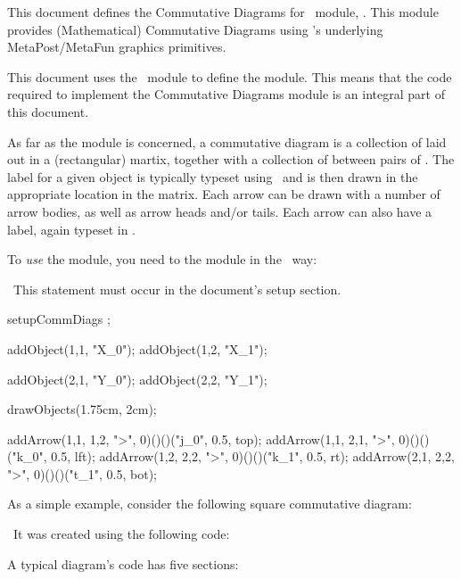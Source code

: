 
\startchapter[title=Overview]

This document defines the Commutative Diagrams for \ConTeXt\ module, 
. This module provides (Mathematical) Commutative 
Diagrams using \ConTeXt's underlying MetaPost/MetaFun graphics primitives. 

This document uses the  \ConTeXt\ module to 
define the  module. This means that the code required to 
implement the Commutative Diagrams module is an integral part of this document. 

As far as the  module is concerned, a commutative diagram 
is a collection of  laid out in a (rectangular) martix, 
together with a collection of  between pairs of 
. The label for a given object is typically typeset using 
\ConTeXt\ and is then drawn in the appropriate location in the matrix. 
Each arrow can be drawn with a number of arrow bodies, as well as arrow 
heads and/or tails. Each arrow can also have a label, again typeset in 
\ConTeXt. 

To \emph{use} the  module, you need to  the 
 module in the  \ConTeXt\ way: 

\starttyping
\usemodule[t-commdiag]
\stoptyping

\noindent\ This \type{\usemodule} statement must occur in the document's 
setup section.

\startbuffer
\startformula {}  
  setupCommDiags ; 
  
  addObject(1,1, "X_0");
  addObject(1,2, "X_1");
  
  addObject(2,1, "Y_0");
  addObject(2,2, "Y_1");

  drawObjects(1.75cm, 2cm);

  addArrow(1,1, 1,2, ">", 0)()()("j_0",     0.5, top);
  addArrow(1,1, 2,1, ">", 0)()()("k_0",     0.5, lft);
  addArrow(1,2, 2,2, ">", 0)()()("k_1",     0.5, rt);
  addArrow(2,1, 2,2, ">", 0)()()("t_1",     0.5, bot);
\stopMPcode \stopformula
\stopbuffer

As a simple example, consider the following square commutative diagram: 
\processTEXbuffer

\noindent\ It was created using the following  code:

\typebuffer

A typical  diagram's code has five sections:

